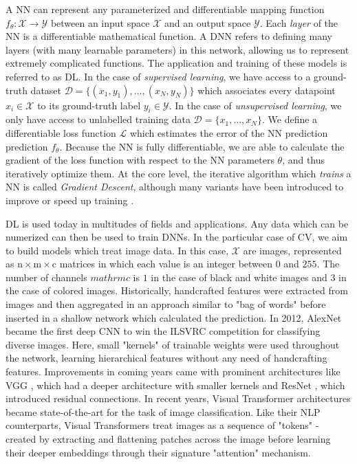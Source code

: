 A \ac{NN} can represent any parameterized and differentiable mapping function 
$f_\theta : \mathcal{X} \rightarrow \mathcal{Y}$ 
between an input space $\mathcal{X}$ and an output space $\mathcal{Y}$. Each \emph{layer} of the 
\ac{NN} is a differentiable mathematical function. A \ac{DNN} refers to defining many layers 
(with many learnable parameters) in this network, allowing us to represent extremely complicated functions.
The application and training of these models is referred to as \ac{DL}.
In the case of \emph{supervised learning}, we have access to a ground-truth dataset $\mathcal{D} = 
\{(x_1, y_1), ..., (x_N, y_N)\}$ which associates every datapoint $x_i \in \mathcal{X}$ to its
ground-truth label $y_i \in \mathcal{Y}$. In the case of \emph{unsupervised learning}, we only 
have access to unlabelled training data $\mathcal{D} = \{x_1, ..., x_N\}$. 
We define a differentiable loss function $\mathcal{L}$ which estimates the error of the  \ac{NN}
prediction prediction $f_\theta$. Because the \ac{NN}
is fully differentiable, we are able to calculate the gradient of the loss function with respect 
to the \ac{NN} parameters $\theta$, and thus iteratively optimize them. At the core level,
the iterative algorithm which \emph{trains} a \ac{NN} is called \emph{Gradient Descent},
 although many variants have been introduced to improve or speed up training \citep{ruder2016overview}.

\ac{DL} is used today in multitudes of fields and applications. Any data which can be numerized 
can then be used to train \ac{DNN}s. In the particular case of \ac{CV}, we aim to build models 
which treat image data. In this case, $\mathcal{X}$ are images, represented as 
$\mathrm{n} \times \mathrm{m} \times \mathrm{c}$ matrices in which each value is an integer 
between $0$ and $255$. The number of channels $mathrm{c}$ is $1$ in the case of black and white 
images and $3$
in the case of colored images. Historically, handcrafted features were extracted from images and 
then aggregated in an approach similar to "bag of words" \citep{lowe2004distinctive, ahonen2004face, dalal2005histograms}
before inserted in a shallow network which calculated the prediction. In 2012, AlexNet \citep{krizhevsky2012imagenet}
became the first deep \ac{CNN} to win the \ac{ILSVRC} competition for classifying diverse images.
Here, small "kernels" of trainable weights were used throughout the network, learning hierarchical 
features without any need of handcrafting features.
Improvements in coming years came with prominent architectures like VGG \citep{simonyan2014very}, which 
had a deeper architecture with smaller kernels 
and ResNet \citep{he2016resnet}, which introduced residual connections. In recent years, 
Visual Transformer architectures \citep{dosovitskiy2020vit, touvron2021deit, chen2022pali} became state-of-the-art for the task of 
image classification. Like their \ac{NLP} counterparts, Visual Transformers treat images 
as a sequence of "tokens" - created by extracting and flattening patches across the image before 
learning their deeper embeddings through their signature "attention" mechanism. 


